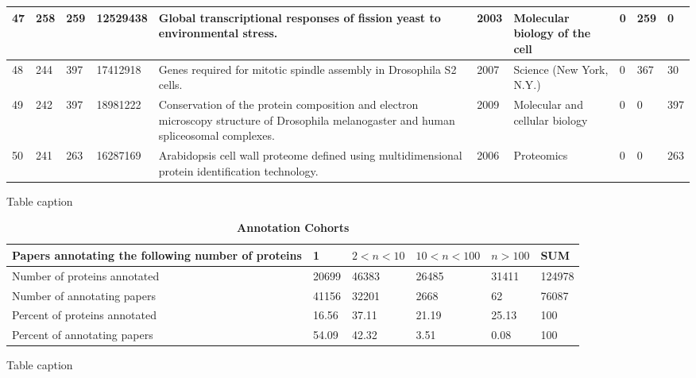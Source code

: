 \documentclass[12pt]{article}
\begin{document}
\begin{table}[!ht]
\begin{tabular}{|l|l|l|l|l|l|l|l|l|l|}
47 & 258 & 259 & 12529438 & Global transcriptional responses of fission yeast to environmental stress. & 2003 & Molecular biology of the cell & 0 & 259 & 0 \\ \hline
48 & 244 & 397 & 17412918 & Genes required for mitotic spindle assembly in Drosophila S2 cells. & 2007 & Science (New York, N.Y.) & 0 & 367 & 30 \\ \hline
49 & 242 & 397 & 18981222 & Conservation of the protein composition and electron microscopy structure of Drosophila melanogaster and human spliceosomal complexes. & 2009 & Molecular and cellular biology & 0 & 0 & 397 \\ \hline
50 & 241 & 263 & 16287169 & Arabidopsis cell wall proteome defined using multidimensional protein identification technology. & 2006 & Proteomics & 0 & 0 & 263 \\ \hline
\end{tabular}
\begin{flushleft}Table caption
\end{flushleft}
\label{tab:top50}
\end{table}



\begin{table}[!ht]
\caption{
\bf{Annotation Cohorts}}
\begin{tabular}{||p{5cm}||l|l|l|l||l||}
\hline
Papers annotating the following number of proteins & 1 & $2<n<10$ & $10<n<100$ & $n>100$ 
& SUM \\ \hline
Number of proteins annotated & 20699 & 46383 & 26485 & 31411 & 124978 \\ \hline
Number of annotating papers & 41156 & 32201 & 2668 & 62 &  76087 \\ \hline
Percent of proteins annotated & 16.56 & 37.11 & 21.19 & 25.13 & 100 \\ \hline
Percent of annotating papers & 54.09 & 42.32 & 3.51 & 0.08 & 100 \\ \hline 
\end{tabular}
\begin{flushleft}Table caption
\end{flushleft}
\label{tab:cohorts}
\end{table}
\end{document}
